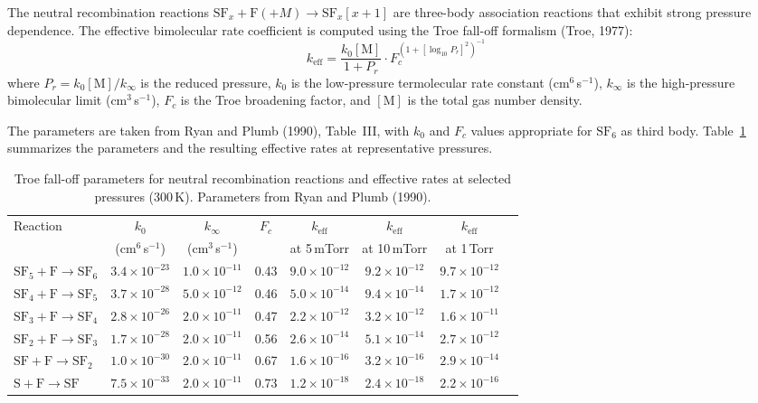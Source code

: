\documentclass[11pt,a4paper]{article}
\newcommand{\SFx}{\mathrm{SF}_x}
\newcommand{\SFsix}{\mathrm{SF}_6}
\newcommand{\SFfive}{\mathrm{SF}_5}
\newcommand{\SFfour}{\mathrm{SF}_4}
\newcommand{\SFthree}{\mathrm{SF}_3}
\begin{document}
The neutral recombination reactions $\SFx + \mathrm{F} (+M) \to \SFx[x+1]$ are three-body association reactions that exhibit strong pressure dependence.  The effective bimolecular rate coefficient is computed using the Troe fall-off formalism (Troe, 1977):
\begin{equation}
k_\mathrm{eff} = \frac{k_0 [\mathrm{M}]}{1 + P_r} \cdot F_c^{\left(1 + [\log_{10} P_r]^2\right)^{-1}}
\label{eq:troe}
\end{equation}
where $P_r = k_0[\mathrm{M}]/k_\infty$ is the reduced pressure, $k_0$ is the low-pressure termolecular rate constant (cm$^6$\,s$^{-1}$), $k_\infty$ is the high-pressure bimolecular limit (cm$^3$\,s$^{-1}$), $F_c$ is the Troe broadening factor, and $[\mathrm{M}]$ is the total gas number density.

The parameters are taken from Ryan and Plumb (1990), Table~III, with $k_0$ and $F_c$ values appropriate for $\SFsix$ as third body.  Table~\ref{tab:troe} summarizes the parameters and the resulting effective rates at representative pressures.

\begin{table}[H]
\centering
\caption{Troe fall-off parameters for neutral recombination reactions and effective rates at selected pressures (300\,K).  Parameters from Ryan and Plumb (1990).}
\label{tab:troe}
\small
\begin{tabular}{lccccccc}
\toprule
Reaction & $k_0$ & $k_\infty$ & $F_c$ & $k_\mathrm{eff}$ & $k_\mathrm{eff}$ & $k_\mathrm{eff}$ \\
& (cm$^6$\,s$^{-1}$) & (cm$^3$\,s$^{-1}$) & & at 5\,mTorr & at 10\,mTorr & at 1\,Torr \\
\midrule
$\SFfive + \mathrm{F} \to \SFsix$ & $3.4\times10^{-23}$ & $1.0\times10^{-11}$ & 0.43 & $9.0\times10^{-12}$ & $9.2\times10^{-12}$ & $9.7\times10^{-12}$ \\
$\SFfour + \mathrm{F} \to \SFfive$ & $3.7\times10^{-28}$ & $5.0\times10^{-12}$ & 0.46 & $5.0\times10^{-14}$ & $9.4\times10^{-14}$ & $1.7\times10^{-12}$ \\
$\SFthree + \mathrm{F} \to \SFfour$ & $2.8\times10^{-26}$ & $2.0\times10^{-11}$ & 0.47 & $2.2\times10^{-12}$ & $3.2\times10^{-12}$ & $1.6\times10^{-11}$ \\
$\mathrm{SF}_2 + \mathrm{F} \to \SFthree$ & $1.7\times10^{-28}$ & $2.0\times10^{-11}$ & 0.56 & $2.6\times10^{-14}$ & $5.1\times10^{-14}$ & $2.7\times10^{-12}$ \\
$\mathrm{SF} + \mathrm{F} \to \mathrm{SF}_2$ & $1.0\times10^{-30}$ & $2.0\times10^{-11}$ & 0.67 & $1.6\times10^{-16}$ & $3.2\times10^{-16}$ & $2.9\times10^{-14}$ \\
$\mathrm{S} + \mathrm{F} \to \mathrm{SF}$ & $7.5\times10^{-33}$ & $2.0\times10^{-11}$ & 0.73 & $1.2\times10^{-18}$ & $2.4\times10^{-18}$ & $2.2\times10^{-16}$ \\
\bottomrule
\end{tabular}
\end{table}
\end{document}
